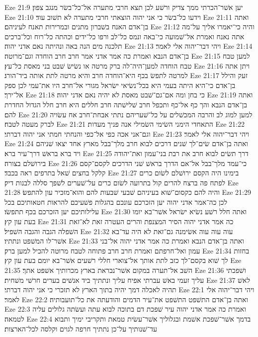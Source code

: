 Eze 21:9  יען אשׁר־הכרתי ממך צדיק ורשׁע לכן תצא חרבי מתערה אל־כל־בשׂר מנגב צפון׃
Eze 21:10  וידעו כל־בשׂר כי אני יהוה הוצאתי חרבי מתערה לא תשׁוב עוד׃
Eze 21:11  ואתה בן־אדם האנח בשׁברון מתנים ובמרירות תאנח לעיניהם׃
Eze 21:12  והיה כי־יאמרו אליך על־מה אתה נאנח ואמרת אל־שׁמועה כי־באה ונמס כל־לב ורפו כל־ידים וכהתה כל־רוח וכל־ברכים תלכנה מים הנה באה ונהיתה נאם אדני יהוה׃
Eze 21:13  ויהי דבר־יהוה אלי לאמר׃
Eze 21:14  בן־אדם הנבא ואמרת כה אמר אדני אמר חרב חרב הוחדה וגם־מרוטה׃
Eze 21:15  למען טבח טבח הוחדה למען־היה־לה ברק מרטה או נשׂישׂ שׁבט בני מאסת כל־עץ׃
Eze 21:16  ויתן אתה למרטה לתפשׂ בכף היא־הוחדה חרב והיא מרטה לתת אותה ביד־הורג׃
Eze 21:17  זעק והילל בן־אדם כי־היא היתה בעמי היא בכל־נשׂיאי ישׂראל מגורי אל־חרב היו את־עמי לכן ספק אל־ירך׃
Eze 21:18  כי בחן ומה אם־גם־שׁבט מאסת לא יהיה נאם אדני יהוה׃
Eze 21:19  ואתה בן־אדם הנבא והך כף אל־כף ותכפל חרב שׁלישׁתה חרב חללים היא חרב חלל הגדול החדרת להם׃
Eze 21:20  למען למוג לב והרבה המכשׁלים על כל־שׁעריהם נתתי אבחת־חרב אח עשׂויה לברק מעטה לטבח׃
Eze 21:21  התאחדי הימני השׂימי השׂמילי אנה פניך מעדות׃
Eze 21:22  וגם־אני אכה כפי אל־כפי והנחתי חמתי אני יהוה דברתי׃
Eze 21:23  ויהי דבר־יהוה אלי לאמר׃
Eze 21:24  ואתה בן־אדם שׂים־לך שׁנים דרכים לבוא חרב מלך־בבל מארץ אחד יצאו שׁניהם ויד ברא בראשׁ דרך־עיר ברא׃
Eze 21:25  דרך תשׂים לבוא חרב את רבת בני־עמון ואת־יהודה בירושׁלם בצורה׃
Eze 21:26  כי־עמד מלך־בבל אל־אם הדרך בראשׁ שׁני הדרכים לקסם־קסם קלקל בחצים שׁאל בתרפים ראה בכבד׃
Eze 21:27  בימינו היה הקסם ירושׁלם לשׂום כרים לפתח פה ברצח להרים קול בתרועה לשׂום כרים על־שׁערים לשׁפך סללה לבנות דיק׃
Eze 21:28  והיה להם כקסום־שׁוא בעיניהם שׁבעי שׁבעות להם והוא־מזכיר עון להתפשׂ׃
Eze 21:29  לכן כה־אמר אדני יהוה יען הזכרכם עונכם בהגלות פשׁעיכם להראות חטאותיכם בכל עלילותיכם יען הזכרכם בכף תתפשׂו׃
Eze 21:30  ואתה חלל רשׁע נשׂיא ישׂראל אשׁר־בא יומו בעת עון קץ׃
Eze 21:31  כה אמר אדני יהוה הסיר המצנפת והרים העטרה זאת לא־זאת השׁפלה הגבה והגבה השׁפיל׃
Eze 21:32  עוה עוה עוה אשׂימנה גם־זאת לא היה עד־בא אשׁר־לו המשׁפט ונתתיו׃
Eze 21:33  ואתה בן־אדם הנבא ואמרת כה אמר אדני יהוה אל־בני עמון ואל־חרפתם ואמרת חרב חרב פתוחה לטבח מרוטה להכיל למען ברק׃
Eze 21:34  בחזות לך שׁוא בקסם־לך כזב לתת אותך אל־צוארי חללי רשׁעים אשׁר־בא יומם בעת עון קץ׃
Eze 21:35  השׁב אל־תערה במקום אשׁר־נבראת בארץ מכרותיך אשׁפט אתך׃
Eze 21:36  ושׁפכתי עליך זעמי באשׁ עברתי אפיח עליך ונתתיך ביד אנשׁים בערים חרשׁי משׁחית׃
Eze 21:37  לאשׁ תהיה לאכלה דמך יהיה בתוך הארץ לא תזכרי כי אני יהוה דברתי׃
Eze 22:1  ויהי דבר־יהוה אלי לאמר׃
Eze 22:2  ואתה בן־אדם התשׁפט התשׁפט את־עיר הדמים והודעתה את כל־תועבותיה׃
Eze 22:3  ואמרת כה אמר אדני יהוה עיר שׁפכת דם בתוכה לבוא עתה ועשׂתה גלולים עליה לטמאה׃
Eze 22:4  בדמך אשׁר־שׁפכת אשׁמת ובגלוליך אשׁר־עשׂית טמאת ותקריבי ימיך ותבוא עד־שׁנותיך על־כן נתתיך חרפה לגוים וקלסה לכל־הארצות׃
